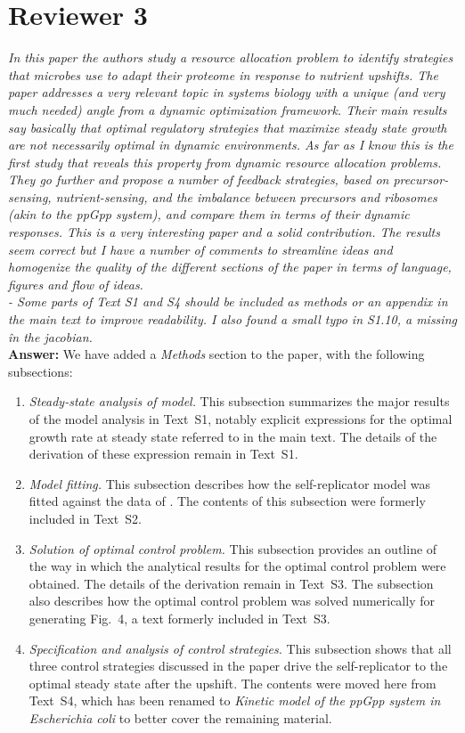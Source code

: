 \documentclass[11pt]{article}
\begin{document}
\section*{Reviewer 3}

\textit{In this paper the authors study a resource allocation problem to identify strategies that microbes use to adapt their proteome in response to nutrient upshifts. The paper addresses a very relevant topic in systems biology with a unique (and very much needed) angle from a dynamic optimization framework. Their main results say basically that optimal regulatory strategies that maximize steady state growth are not necessarily optimal in dynamic environments. As far as I know this is the first study that reveals this property from dynamic resource allocation problems. They go further and propose a number of feedback strategies, based on precursor-sensing, nutrient-sensing, and the imbalance between precursors and ribosomes (akin to the ppGpp system), and compare them in terms of their dynamic responses. This is a very interesting paper and a solid contribution. The results seem correct but I have a number of comments to streamline ideas and homogenize the quality of the different sections of the paper in terms of language, figures and flow of ideas.} \\

\textit{- Some parts of Text S1 and S4 should be included as methods or an appendix in the main text to improve readability. I also found a small typo in S1.10, a missing \^ in the jacobian.} \\

\noindent\textbf{Answer:} We have added a \textit{Methods} section to the paper, with the following subsections:

\begin{enumerate}
\item \textit{Steady-state analysis of model.} This subsection summarizes the major results of the model analysis in Text~S1, notably explicit expressions for the optimal growth rate at steady state referred to in the main text. The details of the derivation of these expression remain in Text~S1. 
\item \textit{Model fitting.} This subsection describes how the self-replicator model was fitted against the data of \cite{Scott2010}. The contents of this subsection were formerly included in Text~S2.
\item \textit{Solution of optimal control problem.} This subsection provides an outline of the way in which the analytical results for the optimal control problem were obtained. The details of the derivation remain in Text~S3. The subsection also describes how the optimal control problem was solved numerically for generating Fig.~4, a text formerly included in Text~S3.
\item \textit{Specification and analysis of control strategies.} This subsection shows that all three control strategies discussed in the paper drive the self-replicator to the optimal steady state after the upshift. The contents were moved here from Text~S4, which has been renamed to \textit{Kinetic model of the ppGpp system in Escherichia coli} to better cover the remaining material.
\end{enumerate}  
\end{document}
